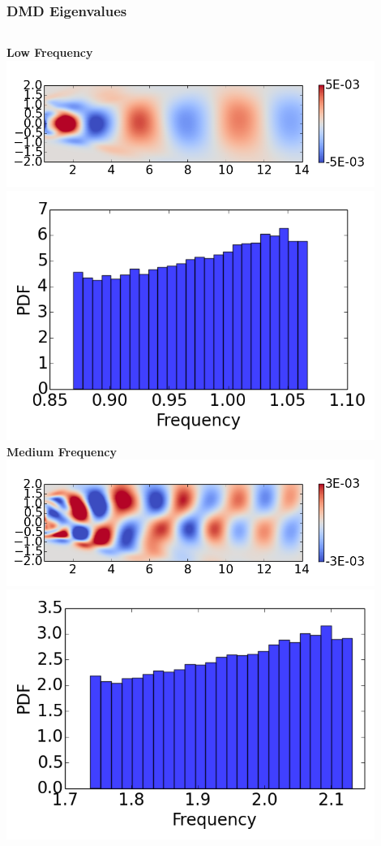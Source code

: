\documentclass[9pt]{beamer}
\begin{document}
\begin{frame}
\frametitle{DMD Eigenvalues}
\label{sec-3-6}

\begin{columns}[c]
   \centering
    \textbf{Low Frequency} \\
    \includegraphics[width=0.9\textwidth]{DMDMode1} \\
    \includegraphics[width=0.9\textwidth]{PerturbDMDEigSlowPDF}
   \centering
    \textbf{Medium Frequency} \\
    \includegraphics[width=0.9\textwidth]{DMDMode2} \\
    \includegraphics[width=0.9\textwidth]{PerturbDMDEigMediumPDF}

\end{columns}
\end{frame}
\end{document}
